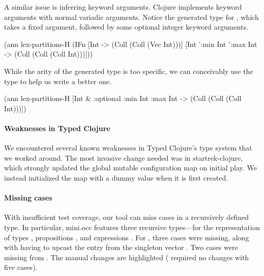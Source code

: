 A similar issue is inferring keyword arguments. Clojure implements
keyword arguments with normal variadic arguments. Notice
the generated type for ,
which takes a fixed argument, followed by some optional integer keyword
arguments. 

\begin{cljlisting}
(ann lex-partitions-H
  (IFn [Int -> (Coll (Coll (Vec Int)))]
       [Int ':min Int ':max Int 
        -> (Coll (Coll (Coll Int)))]))
\end{cljlisting}

While the arity of the generated type is too specific,
we can conceivably use the type to help us write a better one.

\begin{cljlisting}
(ann lex-partitions-H
  [Int & :optional {:min Int :max Int}
   -> (Coll (Coll (Coll Int)))])
\end{cljlisting}

\paragraph{Weaknesses in Typed Clojure}

We encountered several known weaknesses in Typed Clojure's type system
that we worked around.
%
The most invasive change needed was in startrek-clojure, which
strongly updated the global mutable configuration map on initial
play. We instead initialized the map with a dummy
value when it is first created.

\paragraph{Missing  cases}

With insufficient test coverage, our tool can miss cases in a recursively defined
type.
In particular, mini.occ features three recursive types---for the representation
of types , propositions , and expressions .
For , three cases were missing, along with having to upcast the 
entry from the singleton vector .
Two cases were missing from .
The manual changes are highlighted ( required no changes with five cases).

